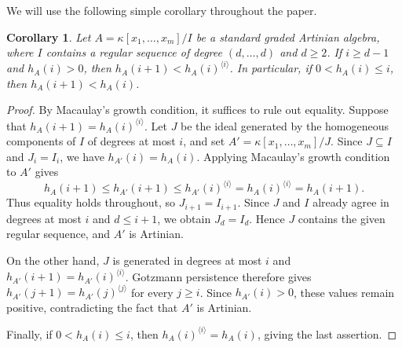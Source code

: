 \documentclass[11pt]{amsart}
\newtheorem{corollary}[theorem]{Corollary}
\theoremstyle{definition}
\newcommand{\PP}{\mathbb{P}}
\begin{document}
We will use the following simple corollary throughout the paper.
\begin{corollary}\label{cor: Gotzman persistence}
Let $A=\kappa[x_1,\dots,x_m]/I$ be a standard graded Artinian algebra, where $I$ contains a regular sequence of degree $(d,\dots,d)$ and $d\ge2$. If $i\ge d-1$ and $h_A(i)>0$, then $h_A(i+1)<h_A(i)^{\langle i\rangle}$. In particular, if $0<h_A(i)\le i$, then $h_A(i+1)<h_A(i)$.
\end{corollary}

\begin{proof}
By Macaulay's growth condition, it suffices to rule out equality. Suppose that $h_A(i+1)=h_A(i)^{\langle i\rangle}$. Let $J$ be the ideal generated by the homogeneous components of $I$ of degrees at most $i$, and set $A'=\kappa[x_1,\dots,x_m]/J$. Since $J\subseteq I$ and $J_i=I_i$, we have $h_{A'}(i)=h_A(i)$. Applying Macaulay's growth condition to $A'$ gives
\[
h_A(i+1)\le h_{A'}(i+1)
\le h_{A'}(i)^{\langle i\rangle}
=h_A(i)^{\langle i\rangle}
=h_A(i+1).
\]
Thus equality holds throughout, so $J_{i+1}=I_{i+1}$. Since $J$ and $I$ already agree in degrees at most $i$ and $d\le i+1$, we obtain $J_d=I_d$. Hence $J$ contains the given regular sequence, and $A'$ is Artinian.

On the other hand, $J$ is generated in degrees at most $i$ and $h_{A'}(i+1)=h_{A'}(i)^{\langle i\rangle}$. Gotzmann persistence therefore gives $h_{A'}(j+1)=h_{A'}(j)^{\langle j\rangle}$ for every $j\ge i$. Since $h_{A'}(i)>0$, these values remain positive, contradicting the fact that $A'$ is Artinian.

Finally, if $0<h_A(i)\le i$, then $h_A(i)^{\langle i\rangle}=h_A(i)$, giving the last assertion.
\end{proof}



\end{document}
